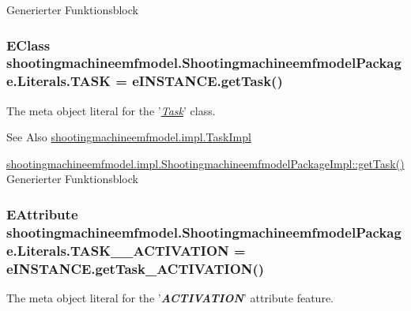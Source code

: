 Generierter Funktionsblock \hypertarget{interfaceshootingmachineemfmodel_1_1_shootingmachineemfmodel_package_1_1_literals_ac7af0c94116439dc2bbf03b03620d74e}{
\subsubsection[{T\-A\-S\-K}]{\setlength{\rightskip}{0pt plus 5cm}E\-Class shootingmachineemfmodel.\-Shootingmachineemfmodel\-Package.\-Literals.\-T\-A\-S\-K = e\-I\-N\-S\-T\-A\-N\-C\-E.\-get\-Task()}}\label{interfaceshootingmachineemfmodel_1_1_shootingmachineemfmodel_package_1_1_literals_ac7af0c94116439dc2bbf03b03620d74e}
The meta object literal for the '\hyperlink{classshootingmachineemfmodel_1_1impl_1_1_task_impl}{{\itshape Task}}' class.

\begin{DoxySeeAlso}{See Also}
\hyperlink{classshootingmachineemfmodel_1_1impl_1_1_task_impl}{shootingmachineemfmodel.\-impl.\-Task\-Impl} 

\hyperlink{classshootingmachineemfmodel_1_1impl_1_1_shootingmachineemfmodel_package_impl_a4cb0a1f2bdfdc0313e25e54cb0e15c45}{shootingmachineemfmodel.\-impl.\-Shootingmachineemfmodel\-Package\-Impl\-::get\-Task()} Generierter Funktionsblock 
\end{DoxySeeAlso}
\hypertarget{interfaceshootingmachineemfmodel_1_1_shootingmachineemfmodel_package_1_1_literals_a65c54662ff66e19e120f5c6774c3b06e}{
\subsubsection[{T\-A\-S\-K\-\_\-\-\_\-\-A\-C\-T\-I\-V\-A\-T\-I\-O\-N}]{\setlength{\rightskip}{0pt plus 5cm}E\-Attribute shootingmachineemfmodel.\-Shootingmachineemfmodel\-Package.\-Literals.\-T\-A\-S\-K\-\_\-\-\_\-\-A\-C\-T\-I\-V\-A\-T\-I\-O\-N = e\-I\-N\-S\-T\-A\-N\-C\-E.\-get\-Task\-\_\-\-A\-C\-T\-I\-V\-A\-T\-I\-O\-N()}}\label{interfaceshootingmachineemfmodel_1_1_shootingmachineemfmodel_package_1_1_literals_a65c54662ff66e19e120f5c6774c3b06e}
The meta object literal for the '{\itshape {\bfseries A\-C\-T\-I\-V\-A\-T\-I\-O\-N}}' attribute feature.

